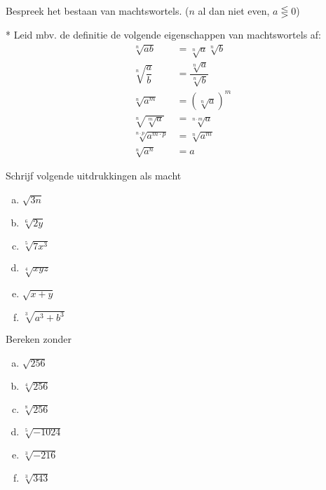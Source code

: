 \documentclass[12pt,twoside]{article}
\begin{document}
\begin{oefening}
Bespreek het bestaan van machtswortels. ($n$ al dan niet even, $a \lesseqgtr 0$)
\end{oefening}

\begin{oefening}*
Leid mbv. de definitie de volgende eigenschappen van machtswortels af:
\begin{align*}
  \sqrt[n]{ab} &= \sqrt[n]{a}\sqrt[n]{b}\\
  \sqrt[n]{\dfrac{a}{b}} &= \dfrac{\sqrt[n]{a}}{\sqrt[n]{b}}\\
  \sqrt[n]{a^m} &= \left(\sqrt[n]{a}\right)^m\\
  \sqrt[n]{\sqrt[m]{a}} &= \sqrt[n\cdot m]{a}\\
  \sqrt[n\cdot p]{a^{m\cdot p}} &= \sqrt[n]{a^m}\\
  \sqrt[n]{a^n} &= a
\end{align*}
\end{oefening}

\begin{oefening}
  Schrijf volgende uitdrukkingen als macht
  \begin{multicols}{3}
    \begin{enumerate}[(a)]
      \itemsep1em
    \item \(\sqrt {3n} \)
    \item \(\sqrt[6]{{2y}}\)
    \item \(\sqrt[5]{{7{x^3}}}\)
    \item \(\sqrt[4]{{xyz}}\)
    \item \(\sqrt {x + y} \)
    \item \(\sqrt[3]{{{a^3} + {b^3}}}\)
    \end{enumerate}
  \end{multicols}
\end{oefening}

\begin{oefening}
  Bereken zonder 
  \begin{multicols}{3}
    \begin{enumerate}[(a)]
      \itemsep1em
    \item \(\sqrt {256} \)
    \item \(\sqrt[4]{{256}}\)
    \item \(\sqrt[8]{{256}}\)
    \item \(\sqrt[5]{{ - 1024}}\)
    \item \(\sqrt[3]{{ - 216}}\)
    \item \(\sqrt[3]{{343}}\)
    \end{enumerate}
  \end{multicols}
\end{oefening}
\end{document}
